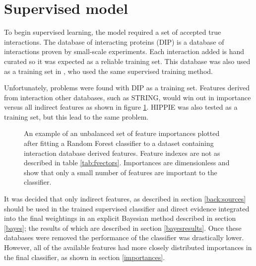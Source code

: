 
\section{Supervised model}
\label{gold}

To begin supervised learning, the model required a set of accepted true interactions.
The database of interacting proteins (\ac{DIP}) is a database of interactions proven by small-scale experiments\autocite{xenarios_dip_2002}.
Each interaction added is hand curated so it was expected as a reliable training set.
This database was also used as a training set in \textcite{qi_evaluation_2006}, who used the same supervised training method.

Unfortunately, problems were found with \ac{DIP} as a training set. 
Features derived from interaction other databases, such as STRING, would win out in importance versus all indirect features as shown in figure \ref{fig:unbalanced}.
\ac{HIPPIE} was also tested as a training set, but this lead to the same problem.

\begin{figure}
    \centering
    \setlength\figureheight{3in}
    \setlength\figurewidth{4in}
    \caption{An example of an unbalanced set of feature importances plotted after fitting a Random Forest classifier to a dataset containing interaction database derived features. Feature indexes are not as described in table \ref{tab:fvectors}. Importances are dimensionless and show that only a small number of features are important to the classifier.}
    \label{fig:unbalanced}
\end{figure}

It was decided that only indirect features, as described in section \ref{back:sources} should be used in the trained supervised classifier and direct evidence integrated into the final weightings in an explicit Bayesian method described in section \ref{bayes}; the results of which are described in section \ref{bayesresults}.
Once these databases were removed the performance of the classifier was drastically lower.
However, all of the available features had more closely distributed importances in the final classifier, as shown in section \ref{importances}.


